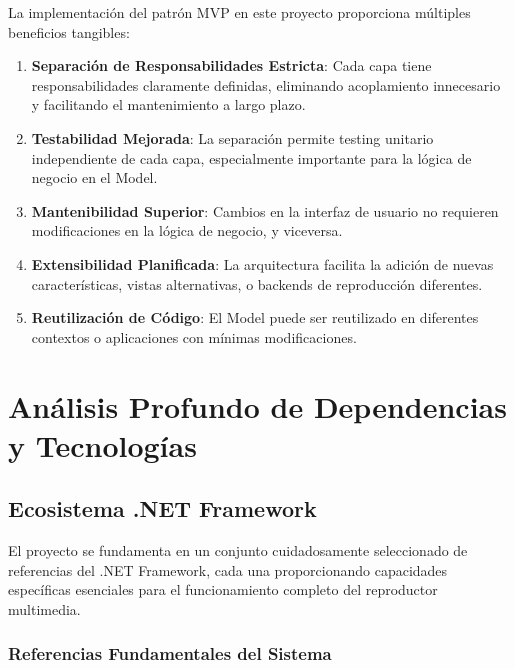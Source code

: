 \documentclass[a4paper]{article}
\begin{document}
La implementación del patrón MVP en este proyecto proporciona múltiples beneficios tangibles:

\begin{enumerate}
\item \textbf{Separación de Responsabilidades Estricta}: Cada capa tiene responsabilidades claramente definidas, eliminando acoplamiento innecesario y facilitando el mantenimiento a largo plazo.

\item \textbf{Testabilidad Mejorada}: La separación permite testing unitario independiente de cada capa, especialmente importante para la lógica de negocio en el Model.

\item \textbf{Mantenibilidad Superior}: Cambios en la interfaz de usuario no requieren modificaciones en la lógica de negocio, y viceversa.

\item \textbf{Extensibilidad Planificada}: La arquitectura facilita la adición de nuevas características, vistas alternativas, o backends de reproducción diferentes.

\item \textbf{Reutilización de Código}: El Model puede ser reutilizado en diferentes contextos o aplicaciones con mínimas modificaciones.
\end{enumerate}

\section{Análisis Profundo de Dependencias y Tecnologías}

\subsection{Ecosistema .NET Framework}

El proyecto se fundamenta en un conjunto cuidadosamente seleccionado de referencias del .NET Framework, cada una proporcionando capacidades específicas esenciales para el funcionamiento completo del reproductor multimedia.

\subsubsection{Referencias Fundamentales del Sistema}
\end{document}

